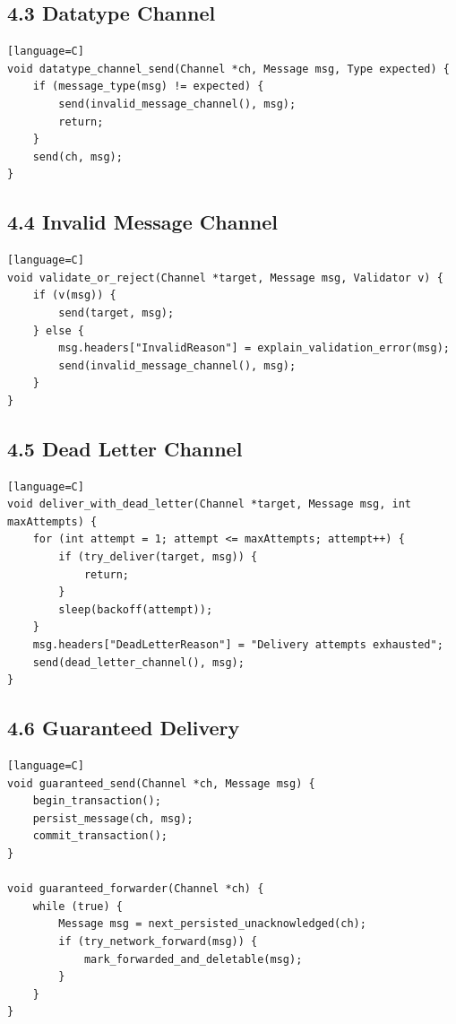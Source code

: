 \documentclass[11pt]{article}
\begin{document}
\subsection{4.3 Datatype Channel}\label{datatype-channel}

\begin{verbatim}[language=C]
void datatype_channel_send(Channel *ch, Message msg, Type expected) {
    if (message_type(msg) != expected) {
        send(invalid_message_channel(), msg);
        return;
    }
    send(ch, msg);
}
\end{verbatim}

\subsection{4.4 Invalid Message Channel}\label{invalid-message-channel}

\begin{verbatim}[language=C]
void validate_or_reject(Channel *target, Message msg, Validator v) {
    if (v(msg)) {
        send(target, msg);
    } else {
        msg.headers["InvalidReason"] = explain_validation_error(msg);
        send(invalid_message_channel(), msg);
    }
}
\end{verbatim}

\subsection{4.5 Dead Letter Channel}\label{dead-letter-channel}

\begin{verbatim}[language=C]
void deliver_with_dead_letter(Channel *target, Message msg, int maxAttempts) {
    for (int attempt = 1; attempt <= maxAttempts; attempt++) {
        if (try_deliver(target, msg)) {
            return;
        }
        sleep(backoff(attempt));
    }
    msg.headers["DeadLetterReason"] = "Delivery attempts exhausted";
    send(dead_letter_channel(), msg);
}
\end{verbatim}

\subsection{4.6 Guaranteed Delivery}\label{guaranteed-delivery}

\begin{verbatim}[language=C]
void guaranteed_send(Channel *ch, Message msg) {
    begin_transaction();
    persist_message(ch, msg);
    commit_transaction();
}

void guaranteed_forwarder(Channel *ch) {
    while (true) {
        Message msg = next_persisted_unacknowledged(ch);
        if (try_network_forward(msg)) {
            mark_forwarded_and_deletable(msg);
        }
    }
}
\end{verbatim}
\end{document}
